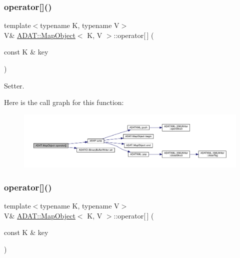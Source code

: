 \subsubsection{\texorpdfstring{operator[]()}{operator[]()}\hspace{0.1cm}{\footnotesize\ttfamily [4/6]}}
{\footnotesize\ttfamily template$<$typename K, typename V$>$ \\
V\& \mbox{\hyperlink{classADAT_1_1MapObject}{A\+D\+A\+T\+::\+Map\+Object}}$<$ K, V $>$\+::operator\mbox{[}$\,$\mbox{]} (\begin{DoxyParamCaption}\item[{const K \&}]{key }\end{DoxyParamCaption})\hspace{0.3cm}{\ttfamily [inline]}}



Setter. 

Here is the call graph for this function\+:
\nopagebreak
\begin{figure}[H]
\begin{center}
\leavevmode
\includegraphics[width=350pt]{da/d29/classADAT_1_1MapObject_ab6ac0d8eccffc7975fd329649dd6f9e7_cgraph}
\end{center}
\end{figure}
\mbox{\label{classADAT_1_1MapObject_ab6ac0d8eccffc7975fd329649dd6f9e7}} 
\subsubsection{\texorpdfstring{operator[]()}{operator[]()}\hspace{0.1cm}{\footnotesize\ttfamily [5/6]}}
{\footnotesize\ttfamily template$<$typename K, typename V$>$ \\
V\& \mbox{\hyperlink{classADAT_1_1MapObject}{A\+D\+A\+T\+::\+Map\+Object}}$<$ K, V $>$\+::operator\mbox{[}$\,$\mbox{]} (\begin{DoxyParamCaption}\item[{const K \&}]{key }\end{DoxyParamCaption})\hspace{0.3cm}{\ttfamily [inline]}}



